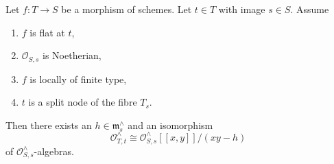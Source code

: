 \begin{lemma}
\label{lemma-formal-local-structure-nodal-family}
Let $f : T \to S$ be a morphism of schemes. Let $t \in T$
with image $s \in S$. Assume
\begin{enumerate}
\item $f$ is flat at $t$,
\item $\mathcal{O}_{S, s}$ is Noetherian,
\item $f$ is locally of finite type,
\item $t$ is a split node of the fibre $T_s$.
\end{enumerate}
Then there exists an $h \in \mathfrak m_s^\wedge$ and an isomorphism
$$
\mathcal{O}_{T, t}^\wedge \cong
\mathcal{O}_{S, s}^\wedge[[x, y]]/(xy - h)
$$
of $\mathcal{O}_{S, s}^\wedge$-algebras.
\end{lemma}


